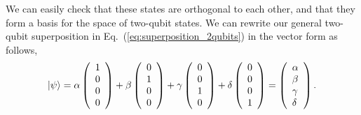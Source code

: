 We can easily check that these states are orthogonal to each other, and that they form a basis for the space of two-qubit states.
We can rewrite our general two-qubit superposition in Eq.~(\ref{eq:superposition_2qubits}) in the vector form as follows,
\begin{equation}
\left| \psi \right\rangle=\alpha\left(\begin{array}{l}
1 \\
0 \\
0 \\
0
\end{array}\right) + \beta\left(\begin{array}{l}
0 \\
1 \\
0 \\
0
\end{array}\right)+\gamma\left(\begin{array}{l}
0 \\
0 \\
1 \\
0
\end{array}\right)+\delta\left(\begin{array}{l}
0 \\
0 \\
0 \\
1
\end{array}\right)=\left(\begin{array}{l}
\alpha \\
\beta \\
\gamma \\
\delta
\end{array}\right).
\end{equation}

